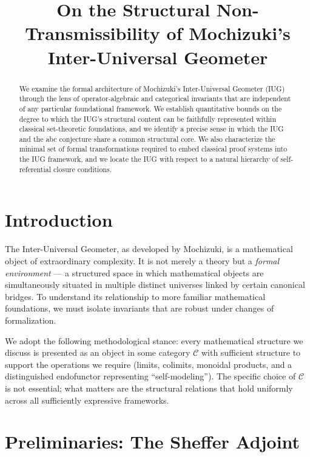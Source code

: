 \documentclass{article}
\begin{document}
\title{On the Structural Non-Transmissibility of Mochizuki's Inter-Universal Geometer}
\author{}
\date{}

\maketitle

\begin{abstract}
We examine the formal architecture of Mochizuki's Inter-Universal Geometer (IUG) through the lens of operator-algebraic and categorical invariants that are independent of any particular foundational framework. We establish quantitative bounds on the degree to which the IUG's structural content can be faithfully represented within classical set-theoretic foundations, and we identify a precise sense in which the IUG and the abc conjecture share a common structural core. We also characterize the minimal set of formal transformations required to embed classical proof systems into the IUG framework, and we locate the IUG with respect to a natural hierarchy of self-referential closure conditions.
\end{abstract}

\section{Introduction}

The Inter-Universal Geometer, as developed by Mochizuki, is a mathematical object of extraordinary complexity. It is not merely a theory but a \emph{formal environment} — a structured space in which mathematical objects are simultaneously situated in multiple distinct universes linked by certain canonical bridges. To understand its relationship to more familiar mathematical foundations, we must isolate invariants that are robust under changes of formalization.

We adopt the following methodological stance: every mathematical structure we discuss is presented as an object in some category $\mathcal{C}$ with sufficient structure to support the operations we require (limits, colimits, monoidal products, and a distinguished endofunctor representing ``self-modeling''). The specific choice of $\mathcal{C}$ is not essential; what matters are the structural relations that hold uniformly across all sufficiently expressive frameworks.

\section{Preliminaries: The Sheffer Adjoint}
\end{document}
